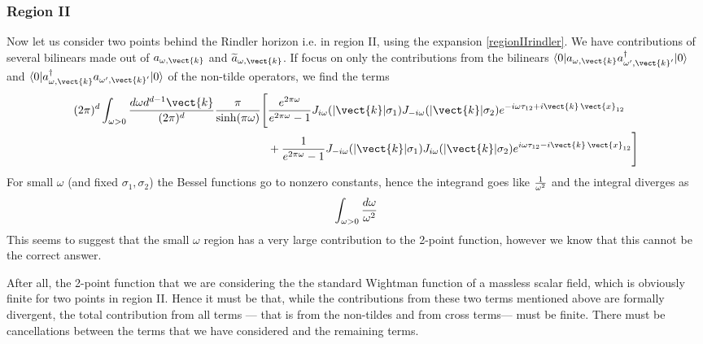 \subsubsection{Region II}

Now let us consider two points behind the Rindler horizon i.e. in region II, using the expansion \eqref{regionIIrindler}. We have contributions of several bilinears made out of $a_{\omega,\vect{k}}$ and $\widetilde{a}_{\omega,\vect{k}}$. If focus on only the contributions from the bilinears $\langle 0|a_{\omega,\vect{k}}
a_{\omega',\vect{k}'}^\dagger|0\rangle$ and $\langle 0|a_{\omega,\vect{k}}^\dagger
a_{\omega',\vect{k}'}|0\rangle$ of the non-tilde operators, we find the terms
\[
\begin{split}
 (2\pi)^d \int_{\omega>0}{d\omega d^{d-1}\vect{k}  \over (2 \pi)^d} {\pi \over \sinh(\pi \omega)}\Bigg[ &{e^{2\pi \omega} \over e^{2\pi \omega}-1} J_{i\omega}(|\vect{k}|\sigma_1)
 J_{-i\omega}(|\vect{k}|\sigma_2)e^{-i\omega \tau_{12}+i \vect{k}\,\vect{x}_{12}}\\
& + {1 \over e^{2\pi \omega}-1} J_{-i\omega}(|\vect{k}|\sigma_1)
 J_{i\omega}(|\vect{k}|\sigma_2)e^{i\omega \tau_{12}-i \vect{k}\,\vect{x}_{12}}\Bigg]
\end{split}
\]
For small $\omega$ (and fixed $\sigma_1,\sigma_2$) the Bessel functions go to nonzero constants, hence the integrand goes like ${1\over \omega^2}$ and the integral
diverges as
\[
 \int_{\omega>0} {d\omega \over \omega^2}
 \]
This seems to suggest that the small $\omega$ region has a very large contribution to the 2-point function, however we know that this cannot be the correct answer.

After all, the 2-point function that we are considering the the standard Wightman function of a massless scalar field, which is obviously finite for two points in region II. Hence it must be that, while the contributions from these two terms mentioned above are formally divergent, the total contribution from all terms --- that is from the non-tildes and from cross terms--- must be finite. There must be cancellations between the terms that we have considered and the remaining terms. 

